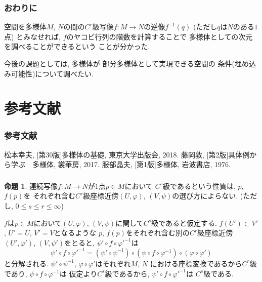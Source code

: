 \documentclass[dvipdfmx,cjk]{beamer}
\theoremstyle{definition}
\newtheorem{prop}[dfn]{\textbf{ 命題 }}
\begin{document}
\begin{frame}
    \frametitle{おわりに}
  空間を多様体$M$, $N$の間の$C^r$級写像$f:M\to N$の逆像$f^{-1}(q)$
(ただし$q$は$N$のある$1$点)
とみなせれば, $f$のヤコビ行列の階数を計算することで
多様体としての次元を調べることができるという
ことが分かった. 

今後の課題としては, 多様体が
部分多様体として実現できる空間の
条件(埋め込み可能性)について調べたい. 
\end{frame}

\section{参考文献}
\begin{frame}
\frametitle{参考文献} 
\begin{thebibliography}{1}
\beamertemplatetextbibitems
{} 松本幸夫, [第30版]多様体の基礎, 東京大学出版会, 2018.
   藤岡敦, [第2版]具体例から学ぶ　多様体, 裳華房, 2017.
   服部晶夫, [第1版]多様体, 岩波書店, 1976.
\end{thebibliography}
\end{frame}

\begin{frame}
  \frametitle{}
  \begin{prop}
    連続写像$f:M\to N$が$1$点$p\in M$において
    $C^s$級であるという性質は, $p$, $f(p)$を
    それぞれ含む$C^r$級座標近傍$(U,\varphi)$, 
    $(V, \psi)$の選び方によらない. 
    (ただし, $0\leq s \leq r \leq \infty$)
  \end{prop}
    $f$は$p\in M$において$(U,\varphi)$, 
    $(V, \psi)$に関して$C^s$級であると仮定する. 
    $f(U')\subset V'$, $U'=U$, $V'=V$となるような
    $p$, $f(p)$をそれぞれ含む別の$C^r$級座標近傍
    $(U',\varphi')$, $(V, \psi')$をとると, 
    $\psi'\circ f\circ \varphi'^{-1}$は
    $$\psi'\circ f\circ \varphi'^{-1}=
    (\psi'\circ \psi^{-1})\circ
    (\psi \circ f\circ \varphi^{-1})\circ
    (\varphi \circ \varphi')$$
    と分解される. $\psi'\circ \psi^{-1}$, 
    $\varphi \circ \varphi'$はそれぞれ$M$, $N$
    における座標変換であるから$C^r$級であり, 
    $\psi \circ f\circ \varphi^{-1}$は
    仮定より$C^s$級であるから, 
    $\psi'\circ f\circ \varphi'^{-1}$は
    $C^s$級である. 
\end{frame}
\end{document}
